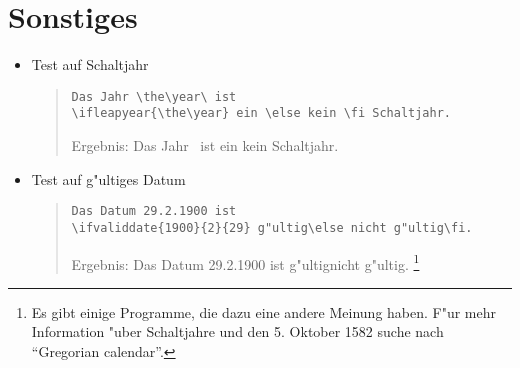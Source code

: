 \documentclass[a4paper,draft]{article}
\begin{document}
\section{Sonstiges}
\begin{itemize}
\item Test auf Schaltjahr
\begin{quote}
\begin{verbatim}
Das Jahr \the\year\ ist
\ifleapyear{\the\year} ein \else kein \fi Schaltjahr.
\end{verbatim}
Ergebnis:  Das Jahr \the\year\ ist \ifleapyear{\the\year} ein \else kein \fi Schaltjahr.
\end{quote}
\item Test auf g"ultiges Datum
\begin{quote}
\begin{verbatim}
Das Datum 29.2.1900 ist
\ifvaliddate{1900}{2}{29} g"ultig\else nicht g"ultig\fi.
\end{verbatim}
Ergebnis: Das Datum 29.2.1900 ist  g"ultig\else nicht g"ultig\fi.%
\footnote{Es gibt einige Programme, die dazu eine andere Meinung haben. F"ur mehr Information "uber Schaltjahre und den 5. Oktober 1582 suche nach "`Gregorian calendar"'.}
\end{quote}
\end{itemize}
\end{document}
